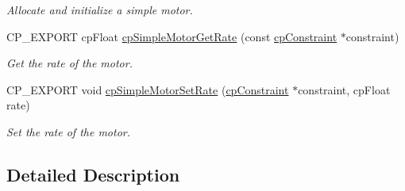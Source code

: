 \begin{DoxyCompactItemize}
\begin{DoxyCompactList}\small\item\em Allocate and initialize a simple motor. \end{DoxyCompactList}\item 
\mbox{\label{group__cpSimpleMotor_gabff92055a8625efe698830a8ee2b1757}} 
C\+P\+\_\+\+E\+X\+P\+O\+RT cp\+Float \hyperlink{group__cpSimpleMotor_gabff92055a8625efe698830a8ee2b1757}{cp\+Simple\+Motor\+Get\+Rate} (const \hyperlink{structcpConstraint}{cp\+Constraint} $\ast$constraint)
\begin{DoxyCompactList}\small\item\em Get the rate of the motor. \end{DoxyCompactList}\item 
\mbox{\label{group__cpSimpleMotor_gaadfe5fd9e818af5dc28929f004092b1b}} 
C\+P\+\_\+\+E\+X\+P\+O\+RT void \hyperlink{group__cpSimpleMotor_gaadfe5fd9e818af5dc28929f004092b1b}{cp\+Simple\+Motor\+Set\+Rate} (\hyperlink{structcpConstraint}{cp\+Constraint} $\ast$constraint, cp\+Float rate)
\begin{DoxyCompactList}\small\item\em Set the rate of the motor. \end{DoxyCompactList}\end{DoxyCompactItemize}


\subsection{Detailed Description}
